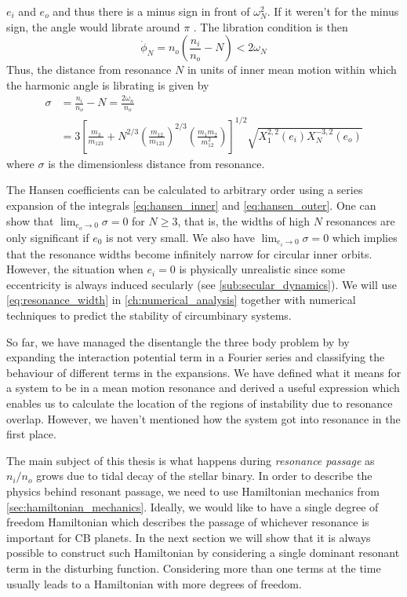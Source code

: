 \documentclass[twoside,openright,titlepage,numbers=noenddot,headinclude,%
                footinclude=true,cleardoublepage=empty,abstractoff, 
                BCOR=5mm,paper=a4,fontsize=11pt,%
                american,%
                ]{scrreprt}%
\begin{document}
$e_i$ and $e_o$ and thus there is a minus sign in front
of $\omega_N^2$. If it weren't for the minus sign, the 
angle would librate around $\pi$ \citet{Mardling2013}.
The libration condition is then
\begin{equation}
    \dot{\phi}_N=n_o\left( \frac{n_i}{n_o} -N\right)<2\omega_N
\end{equation}
Thus, the distance from resonance $N$ in units of inner mean motion
within which the harmonic angle is librating is given by
\begin{equation}
    \begin{aligned}
        \sigma&=\frac{n_i}{n_o} -N= \frac{2\omega_n}{n_o}\\ 
        &= 3\left[ \frac{m_3}{m_{123}} +
    N^{2/3}\left( \frac{m_{12}}{m_{123}}
        \right)^{2/3}\left( \frac{m_1m_2}{m_{12}^2} \right)\right]^{1/2}
        \sqrt{X^{2,2}_1(e_i)X^{-3,2}_N(e_o)}
    \end{aligned}
    \label{eq:resonance_width}
\end{equation}
where $\sigma$ is the dimensionless distance from resonance. 

The Hansen
coefficients can be calculated to arbitrary order using a series expansion
of the integrals \ref{eq:hansen_inner} and \ref{eq:hansen_outer}. One can
show that $\lim_{e_o\rightarrow 0}\sigma=0$ for $N\geq 3$, that is, the 
widths of high $N$ resonances are only significant if $e_0$ is not very
small. We also have $\lim_{e_i\rightarrow 0}\sigma=0$ which implies that
the resonance widths become infinitely narrow for circular inner orbits.
However, the situation when $e_i=0$ is physically unrealistic since some
eccentricity is always induced secularly (see \cref{sub:secular_dynamics}).
We will use \cref{eq:resonance_width} in 
\cref{ch:numerical_analysis} together with numerical techniques to predict the
stability of circumbinary systems.

So far, we have managed the disentangle the three body problem by
by expanding the interaction potential term in a Fourier series and 
classifying the behaviour of different terms in the expansions. We have
defined what it means for a system to be in a mean motion resonance and
derived a useful expression which enables us to calculate the location of 
the regions of instability due to resonance overlap. However, we haven't
mentioned how the system got into resonance in the first place. 

The main
subject of this thesis is what happens during  \emph{resonance
passage} as $n_i/n_o$ grows due to tidal decay of the stellar binary.
In order to describe the physics behind resonant passage, we need to use
Hamiltonian mechanics from \cref{sec:hamiltonian_mechanics}. Ideally, we
would like to have a single degree of freedom Hamiltonian which describes
the passage of whichever resonance is important for CB planets.
In the next section we will show that it is always possible to construct 
such  Hamiltonian by considering a single dominant resonant term in 
the disturbing function. Considering more than one terms at the time
usually leads to a Hamiltonian with more degrees of freedom.
\end{document}
